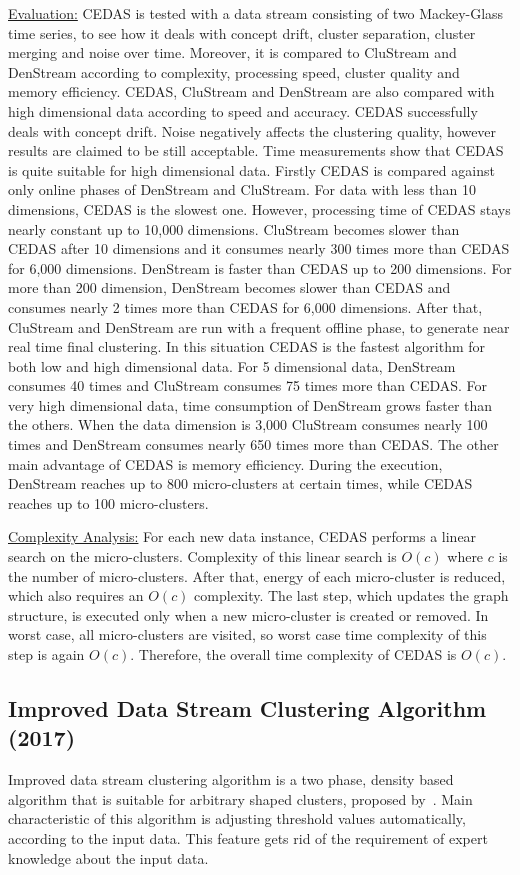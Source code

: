 \documentclass[smallcondensed]{svjour3}     %
\begin{document}
\underline{Evaluation:} CEDAS is tested with a data stream consisting of two Mackey-Glass time series, to see how it deals with concept drift, cluster separation, cluster merging and noise over time. Moreover, it is compared to CluStream and DenStream according to complexity, processing speed, cluster quality and memory efficiency. CEDAS, CluStream and DenStream are also compared with high dimensional data according to speed and accuracy. CEDAS successfully deals with concept drift. Noise negatively affects the clustering quality, however results are claimed to be still acceptable. Time measurements show that CEDAS is quite suitable for high dimensional data. Firstly CEDAS is compared against only online phases of DenStream and CluStream. For data with less than 10 dimensions, CEDAS is the slowest one. However, processing time of CEDAS stays nearly constant up to 10,000 dimensions. CluStream becomes slower than CEDAS after 10 dimensions and it consumes nearly 300 times more than CEDAS for 6,000 dimensions. DenStream is faster than CEDAS up to 200 dimensions. For more than 200 dimension, DenStream becomes slower than CEDAS and consumes nearly 2 times more than CEDAS for 6,000 dimensions. After that, CluStream and DenStream are run with a frequent offline phase, to generate near real time final clustering. In this situation CEDAS is the fastest algorithm for both low and high dimensional data. For 5 dimensional data, DenStream consumes 40 times and CluStream consumes 75 times more than CEDAS. For very high dimensional data, time consumption of DenStream grows faster than the others. When the data dimension is 3,000 CluStream consumes nearly 100 times and DenStream consumes nearly 650 times more than CEDAS. The other main advantage of CEDAS is memory efficiency. During the execution, DenStream reaches up to 800 micro-clusters at certain times, while CEDAS reaches up to 100 micro-clusters.

\underline{Complexity Analysis:} For each new data instance, CEDAS performs a linear search on the micro-clusters. Complexity of this linear search is $O(c)$ where $c$ is the number of micro-clusters. After that, energy of each micro-cluster is reduced, which also requires an $O(c)$ complexity. The last step, which updates the graph structure, is executed only when a new micro-cluster is created or removed. In worst case, all micro-clusters are visited, so worst case time complexity of this step is again $O(c)$. Therefore, the overall time complexity of CEDAS is $O(c)$.

\subsection{Improved Data Stream Clustering Algorithm (2017)}
Improved data stream clustering algorithm is a two phase, density based algorithm that is suitable for arbitrary shaped clusters, proposed by~\citet{Yin2017improvedClustering}. Main characteristic of this algorithm is adjusting threshold values automatically, according to the input data. This feature gets rid of the requirement of expert knowledge about the input data.
\end{document}
